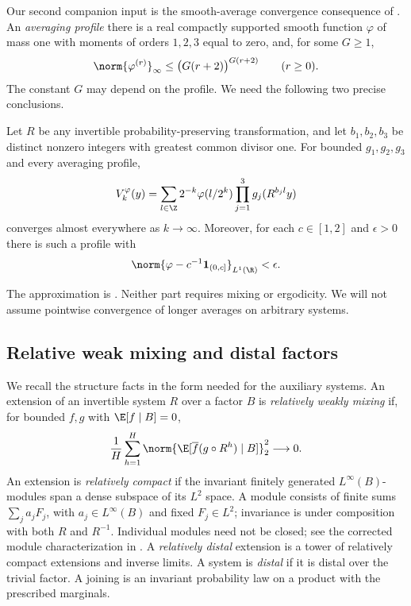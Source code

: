 Our second companion input is the smooth-average convergence consequence
of \cite[Proposition~3.5 and Lemma~3.6]{SlopesCompanion}.
An \emph{averaging profile} there is a real compactly supported smooth
function $\varphi$ of mass one with moments of orders $1,2,3$ equal to
zero, and, for some $G\ge1$,
\[
 \norm{\varphi^{(r)}}_\infty
 \le \bigl(G(r+2)\bigr)^{G(r+2)}\qquad(r\ge0).
\]
The constant $G$ may depend on the profile. We need the following
two precise conclusions.
\begin{proposition}
\label{prop:smooth-input}
Let $R$ be any invertible probability-preserving transformation, and
let $b_1,b_2,b_3$ be distinct nonzero integers with greatest common
divisor one. For bounded $g_1,g_2,g_3$ and every averaging profile,
\[
 V_k^\varphi(y)=\sum_{l\in\Z}2^{-k}\varphi(l/2^k)
              \prod_{j=1}^3g_j(R^{b_jl}y)
\]
converges almost everywhere as $k\to\infty$. Moreover, for each
$c\in[1,2]$ and $\epsilon>0$ there is such a profile with
\[
 \norm{\varphi-c^{-1}\mathbf1_{(0,c]}}_{L^1(\R)}<\epsilon.
\]
\end{proposition}
The approximation is \cite[Lemma~3.9]{SlopesCompanion}. Neither part
requires mixing or ergodicity. We will not assume pointwise convergence
of longer averages on arbitrary systems.

\subsection{Relative weak mixing and distal factors}

We recall the structure facts in the form needed for the auxiliary
systems. An extension of an invertible system $R$ over a factor $B$
is \emph{relatively weakly mixing} if, for bounded $f,g$ with
$\E[f\mid B]=0$,
\begin{equation}\label{eq:rwm}
 \frac1H\sum_{h=1}^H
 \norm{\E[\overline f(g\circ R^h)\mid B]}_2^2\longrightarrow0.
\end{equation}
An extension is \emph{relatively compact} if the invariant finitely
generated $L^\infty(B)$-modules span a dense subspace of its $L^2$
space. A module consists of finite sums $\sum_j a_jF_j$, with
$a_j\in L^\infty(B)$ and fixed $F_j\in L^2$; invariance is under
composition with both $R$ and $R^{-1}$. Individual modules need not be
closed; see the corrected module characterization in
\cite[Theorem~2.5(ii)$'$]{JamneshanCorrigendum2026}.
A \emph{relatively distal} extension is a tower of relatively
compact extensions and inverse limits. A system is \emph{distal} if
it is distal over the trivial factor. A joining is an invariant
probability law on a product with the prescribed marginals.

